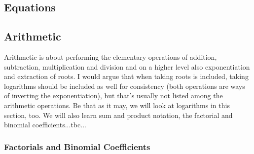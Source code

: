 %
% 



\subsection{Equations}

\subsection{Arithmetic}
Arithmetic is about performing the elementary operations of addition, subtraction, multiplication and division and on a higher level also exponentiation and extraction of roots. I would argue that when taking roots is included, taking logarithms should be included as well for consistency (both operations are ways of inverting the exponentiation), but that's usually not listed among the arithmetic operations. Be that as it may, we will look at logarithms in this section, too. We will also learn sum and product notation, the factorial and binomial coefficients...tbc...

%
%


\subsubsection{Factorials and Binomial Coefficients}



